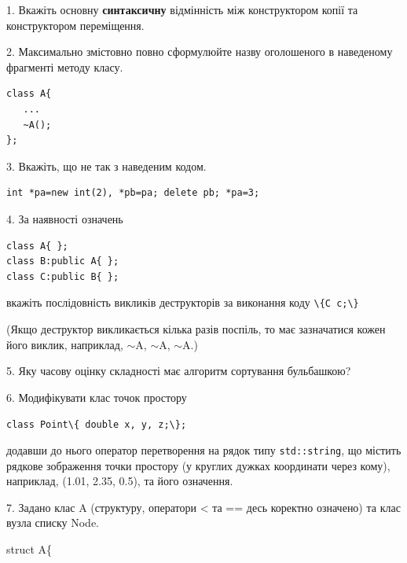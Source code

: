 \documentclass[12pt, ukrainian]{article}
\def\code#1{\Verb!#1!}
\begin{document}
{%
1. Вкажіть основну \textbf{синтаксичну} відмінність між конструктором копії та конструктором переміщення.%
\par
\vspace{2mm}
2. Максимально змістовно повно сформулюйте назву оголошеного в наведеному фрагменті методу класу.
\vspace{-3mm}
\begin{verbatim}class A{
   ...
   ~A();
};\end{verbatim}
\vspace{-3mm}
\par
\vspace{2mm}
3. Вкажіть, що не так з наведеним кодом.
\vspace{-3mm}
\begin{verbatim}int *pa=new int(2), *pb=pa; delete pb; *pa=3;\end{verbatim}
\vspace{-3mm}
\par
\vspace{2mm}
4. За наявності означень
\vspace{-3mm}
\begin{verbatim}
class A{ };
class B:public A{ };
class C:public B{ };\end{verbatim}
\vspace{-3mm}
вкажіть послідовність викликів деструкторів за виконання коду \code{\{C c;\}} 

(Якщо деструктор викликається кілька разів поспіль, то має зазначатися кожен його виклик, наприклад, $\sim$A, $\sim$A, $\sim$A.)

\vspace{2mm}
5. Яку часову оцінку складності має алгоритм сортування бульбашкою?
\par
\vspace{2mm}
6. Модифікувати клас точок простору 

\qquad\code{class Point\{ double x, y, z;\};}


додавши до нього оператор перетворення на рядок типу \code{std::string}, що містить рядкове зображення точки простору (у круглих дужках координати через кому), наприклад, (1.01, 2.35, 0.5), та його означення.%
\par
\vspace{2mm}
7. 
Задано клас A (структуру, оператори < та == десь коректно означено) та клас вузла списку Node.

struct A\{

}
\end{document}
